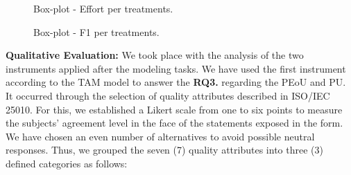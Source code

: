 \begin{figure}[!htb]
        \centering
        \caption{Box-plot - Effort per treatments.}
        \label{fig:boxplotTempo1}
        
\end{figure}


\begin{figure}[!htb]
        \centering
        \caption{Box-plot - F1 per treatments.}
        \label{fig:boxplotMedidaF1}
        
\end{figure}

%     

\textbf{Qualitative Evaluation:} 
We took place with the analysis of the two instruments applied after the modeling tasks.
We have used the first instrument according to the TAM model \cite{Davis:1989,Persico:2014} to answer the \textbf{RQ3.} regarding the PEoU and PU.
It occurred through the selection of quality attributes described in ISO/IEC 25010.
For this, we established a Likert scale from one to six points to measure the subjects' agreement level in the face of the statements exposed in the form.
We have chosen an even number of alternatives to avoid possible neutral responses.
Thus, we grouped the seven (7) quality attributes into three (3) defined categories as follows:

